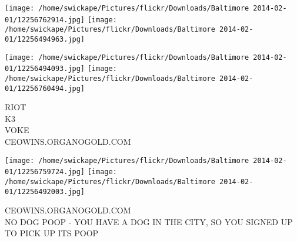 \documentclass[10pt,letterpaper]{article}
\begin{document}
\texttt{[image: /home/swickape/Pictures/flickr/Downloads/Baltimore 2014-02-01/12256762914.jpg]}
\texttt{[image: /home/swickape/Pictures/flickr/Downloads/Baltimore 2014-02-01/12256494963.jpg]}

\texttt{[image: /home/swickape/Pictures/flickr/Downloads/Baltimore 2014-02-01/12256494093.jpg]}
\texttt{[image: /home/swickape/Pictures/flickr/Downloads/Baltimore 2014-02-01/12256760494.jpg]}

RIOT\\
K3\\
VOKE\\
CEOWINS.ORGANOGOLD.COM
\pagebreak

\texttt{[image: /home/swickape/Pictures/flickr/Downloads/Baltimore 2014-02-01/12256759724.jpg]}
\texttt{[image: /home/swickape/Pictures/flickr/Downloads/Baltimore 2014-02-01/12256492003.jpg]}

CEOWINS.ORGANOGOLD.COM\\
NO DOG POOP {-} YOU HAVE A DOG IN THE CITY, SO YOU SIGNED UP TO PICK UP ITS POOP
\pagebreak
\end{document}
